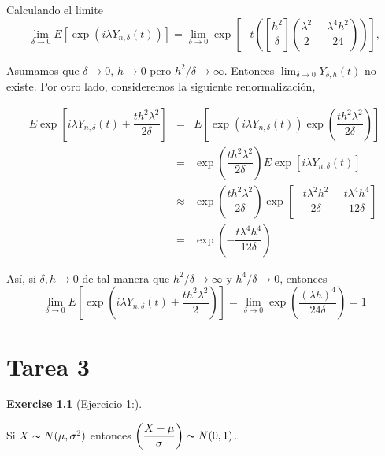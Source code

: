 \documentclass[
  letterpaper,
  DIV=11,
  numbers=noendperiod]{scrreprt}
\theoremstyle{plain}
\theoremstyle{definition}
\newtheorem{exercise}{Exercise}[chapter]
\theoremstyle{remark}
\begin{document}
Calculando el limite \[
\lim_{\delta\to0}E\left[\exp\left(i\lambda Y_{n,\delta}\left(t\right)\right)\right]=\lim_{\delta\to0}\exp\left[-t\left(\left[\dfrac{h^{2}}{\delta}\right]\left(\dfrac{\lambda^{2}}{2}-\dfrac{\lambda^{4}h^{2}}{24}\right)\right)\right],
\]

Asumamos que \(\delta\to0\), \(h\to0\) pero \(h^{2}/\delta\to\infty\).
Entonces \(\lim_{\delta\to0} Y_{\delta, h}(t)\) no existe. Por otro
lado, consideremos la siguiente renormalización,

\[
\begin{eqnarray}
    E\exp\left[i\lambda Y_{n,\delta}\left(t\right)+\dfrac{th^{2}\lambda^{2}}{2\delta}\right] & = & E\left[\exp (i\lambda Y_{n,\delta}\left(t\right))\exp\left(\dfrac{th^{2}\lambda^{2}}{2\delta}\right)\right]\nonumber\\
    & = & \exp\left(\dfrac{th^{2}\lambda^{2}}{2\delta}\right)E\exp\left[ i\lambda Y_{n,\delta}\left(t\right)\right]\nonumber\\
    & \approx & \exp\left(\dfrac{th^{2}\lambda^{2}}{2\delta}\right)\exp\left[-\dfrac{t\lambda^{2} h^{2}}{2\delta}-\dfrac{t\lambda^{4} h^{4}}{12\delta}\right]\nonumber\\
    & = & \exp\left(-\dfrac{t\lambda^{4} h^{4}}{12\delta}\right)
\end{eqnarray}
\]

Así, si \(\delta,h\to0\) de tal manera que \(h^{2}/\delta\to\infty\) y
\(h^{4}/\delta\to0\), entonces \[
\lim_{\delta\to0}E\left[\exp\left(i\lambda Y_{n,\delta}\left(t\right)+\dfrac{th^{2}\lambda^{2}}{2}\right)\right]=\lim_{\delta\to0}\exp\left(\dfrac{\left(\lambda h\right)^{4}}{24\delta}\right)=1
\]


\hypertarget{tarea-3}{%
\chapter{Tarea 3}\label{tarea-3}}

\begin{exercise}[Ejercicio 1:]\protect\hypertarget{exr-1}{}\label{exr-1}

Si \(X\thicksim N(\mu,\sigma^{2})\) entonces
\(\left(\dfrac{X-\mu}{\sigma}\right)\thicksim N(0,1)\).

\end{exercise}
\end{document}
